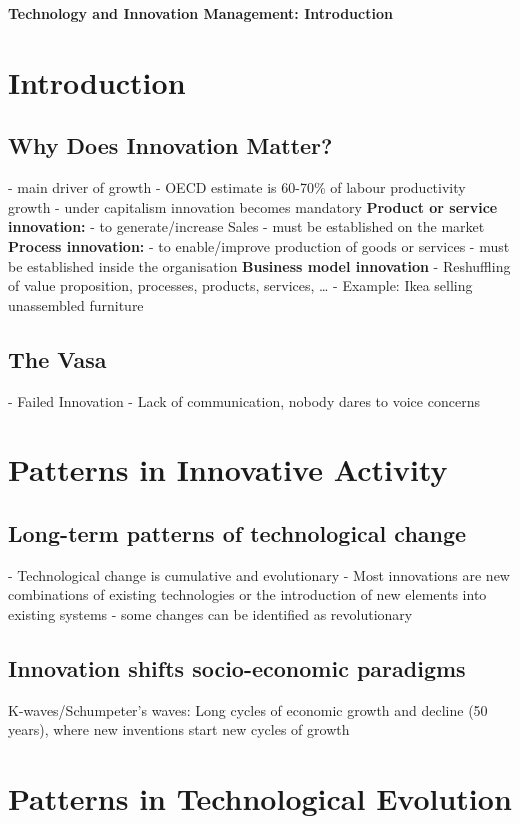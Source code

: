 \documentclass{scrartcl}
\begin{document}
\onehalfspacing
\obeylines
\setlength{\parindent}{0pt}
\begin{center}\LARGE\textbf{Technology and Innovation Management: Introduction}\end{center}

\section*{Introduction}
\subsection*{Why Does Innovation Matter?}
- main driver of growth
- OECD estimate is 60-70\% of labour productivity growth
- under capitalism innovation becomes mandatory
\textbf{Product or service innovation:}
- to generate/increase Sales
- must be established on the market
\textbf{Process innovation:}
- to enable/improve production of goods or services
- must be established inside the organisation
\textbf{Business model innovation}
- Reshuffling of value proposition, processes, products, services, \dots
- Example: Ikea selling unassembled furniture
\subsection*{The Vasa}
- Failed Innovation
- Lack of communication, nobody dares to voice concerns

\section*{Patterns in Innovative Activity}
\subsection*{Long-term patterns of technological change}
- Technological change is cumulative and evolutionary
- Most innovations are new combinations of existing technologies or the introduction of new elements into existing systems
- some changes can be identified as revolutionary
\subsection*{Innovation shifts socio-economic paradigms}
K-waves/Schumpeter's waves: Long cycles of economic growth and decline (50 years), where new inventions start new cycles of growth

\section*{Patterns in Technological Evolution}
\end{document}
